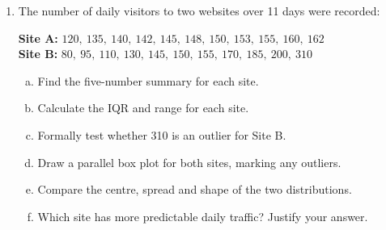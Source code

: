 \documentclass{article}
\begin{document}
\begin{enumerate}
\begin{center}
  \end{center}
  \begin{enumerate}[(a)]
    \item State the five-number summary.
    \item Calculate the IQR and range.
    \item What percentage of students scored between 52 and 74?
    \item What percentage of students scored above 63?
    \item The pass mark is 50. Estimate the percentage of students who passed.
    \item Describe the shape of the distribution and what it suggests about student performance.
  \end{enumerate}

  \item The number of daily visitors to two websites over 11 days were recorded:
  \begin{center}
    \textbf{Site A:} $120,\ 135,\ 140,\ 142,\ 145,\ 148,\ 150,\ 153,\ 155,\ 160,\ 162$\\[4pt]
    \textbf{Site B:} $80,\ 95,\ 110,\ 130,\ 145,\ 150,\ 155,\ 170,\ 185,\ 200,\ 310$
  \end{center}
  \begin{enumerate}[(a)]
    \item Find the five-number summary for each site.
    \item Calculate the IQR and range for each site.
    \item Formally test whether 310 is an outlier for Site B.
    \item Draw a parallel box plot for both sites, marking any outliers.
    \item Compare the centre, spread and shape of the two distributions.
    \item Which site has more predictable daily traffic? Justify your answer.
  \end{enumerate}


\end{enumerate}
\end{document}
